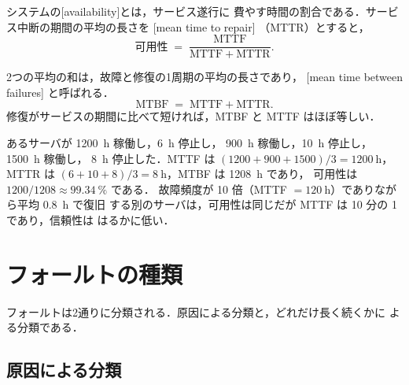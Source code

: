 \documentclass[../main.tex]{subfiles}
\begin{document}
\begin{definition}[可用性]
  システムの[availability]とは，サービス遂行に
  費やす時間の割合である．サービス中断の期間の平均の長さを
  [mean time to repair]%
  （MTTR）とすると，
  \begin{equation}
    \text{可用性} \;=\; \frac{\mathrm{MTTF}}{\mathrm{MTTF}+\mathrm{MTTR}} .
    \label{eq:l17-availability}
  \end{equation}
\end{definition}

2つの平均の和は，故障と修復の1周期の平均の長さであり，
[mean time between failures]%
と呼ばれる．
\begin{equation}
  \mathrm{MTBF} \;=\; \mathrm{MTTF} + \mathrm{MTTR} .
  \label{eq:l17-mtbf}
\end{equation}
修復がサービスの期間に比べて短ければ，MTBF と MTTF はほぼ等しい．

\begin{example}
  \label{ex:l17-availability}
  あるサーバが \SI{1200}{\hour} 稼働し，\SI{6}{\hour} 停止し，
  \SI{900}{\hour} 稼働し，\SI{10}{\hour} 停止し，\SI{1500}{\hour} 稼働し，
  \SI{8}{\hour} 停止した．MTTF は $(1200+900+1500)/3 = \SI{1200}{\hour}$，
  MTTR は $(6+10+8)/3 = \SI{8}{\hour}$，MTBF は \SI{1208}{\hour} であり，
  可用性は $1200/1208 \approx \SI{99.34}{\percent}$ である．%
  故障頻度が
  10 倍（MTTF $=\SI{120}{\hour}$）でありながら平均 \SI{0.8}{\hour} で復旧
  する別のサーバは，可用性は同じだが MTTF は 10 分の 1 であり，信頼性は
  はるかに低い．
\end{example}

\section{フォールトの種類}
\label{sec:l17-kinds}

フォールトは2通りに分類される．原因による分類と，どれだけ長く続くかに
よる分類である．

\subsection{原因による分類}
\end{document}
